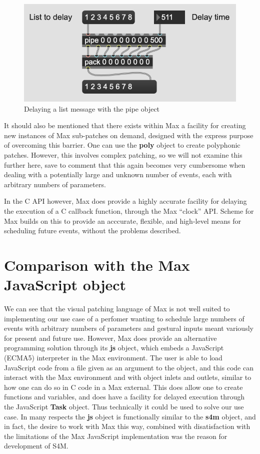 \documentclass[acmsmall]{acmart}
\begin{document}
\begin{figure}[H]
  \centering
  \includegraphics[width=.5\linewidth]{fig-5-pipe}
  \caption{Delaying a list message with the pipe object}
\end{figure}

It should also be mentioned that there exists within Max a facility for creating
new instances of Max sub-patches on demand, designed with the express purpose of
overcoming this barrier. One can use the \textbf{poly} object to create polyphonic
patches. However, this involves complex patching, so we will not examine this further here,
save to comment that this again becomes very cumbersome when dealing
with a potentially large and unknown number of events, each with arbitrary numbers
of parameters.

In the C API however, Max does provide a highly accurate facility for delaying
the execution of a C callback function, through the Max ``clock'' API. Scheme
for Max builds on this to provide an acccurate, flexible, and high-level means 
for scheduling future events, without the problems described.

\section{Comparison with the Max JavaScript object}

We can see that the visual patching language of Max is not well suited to implementing
our use case of a perfomer wanting to schedule large numbers of events with arbitrary numbers of
parameters and gestural inputs meant variously for present and future use. 
However, Max does provide an alternative programming solution through its
\textbf{js} object, which embeds a JavaScript (ECMA5) interpreter in the Max environment.
The user is able to load JavaScript code from a file given as an argument to the object,
and this code can interact with the Max environment and with object inlets and outlets,
similar to how one can do so in C code in a Max external.
This does allow one to create functions and variables, and does have a facility
for delayed execution through the JavaScript \textbf{Task} object. 
Thus technically it could be used to solve our use case.
In many respects the \textbf{js} object is functionally similar to the \textbf{s4m} object,
and in fact, the desire to work with Max this way, combined with disatisfaction with the
limitations of the Max JavaScript implementation was the reason for development of S4M.
\end{document}
